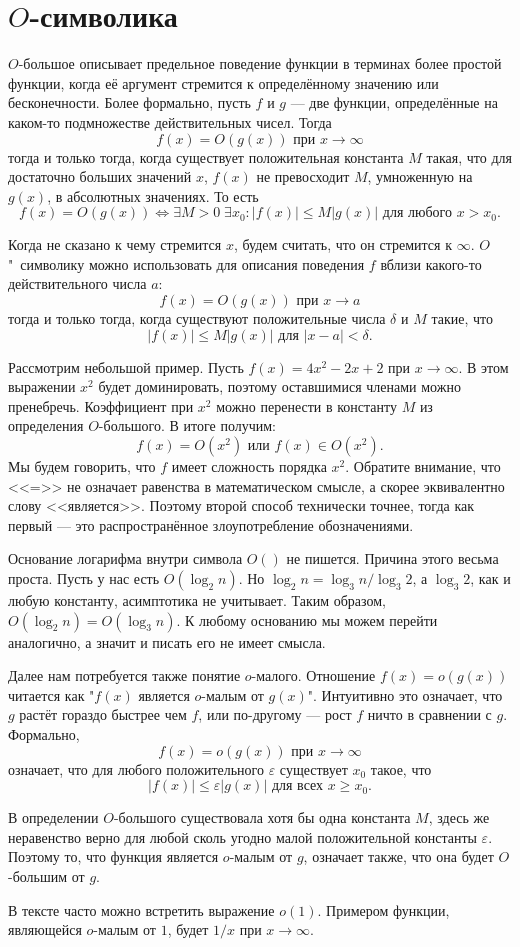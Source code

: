\section{$O$-символика}\label{o_notation}

$O$-большое описывает предельное поведение функции в терминах более простой функции, когда её аргумент стремится к определённому значению или бесконечности. Более формально, пусть $f$ и $g$ --- две функции, определённые на каком-то подмножестве действительных чисел. Тогда
\[
	f(x)=O(g(x)) \mbox{ при } x \rightarrow \infty
\]
тогда и только тогда, когда существует положительная константа $M$ такая, что для достаточно больших значений $x$, $f(x)$ не превосходит $M$, умноженную на $g(x)$, в абсолютных значениях. То есть 
\[
	f(x) = O(g(x)) \iff \exists M > 0 \; \exists x_0: |f(x)| \leq M |g(x)| \mbox{ для любого } x > x_0.
\]

Когда не сказано к чему стремится $x$, будем считать, что он стремится к $\infty$. $O$"~символику можно использовать для описания поведения $f$ вблизи какого-то действительного числа $a$:
\[
	f(x)=O(g(x)) \mbox{ при } x \rightarrow a
\]
тогда и только тогда, когда существуют положительные числа $\delta$ и $M$ такие, что
\[
	|f(x)| \leq M |g(x)| \mbox{ для } |x - a| < \delta.
\]

Рассмотрим небольшой пример. Пусть $f(x) = 4 x^2 - 2 x + 2$ при $x \rightarrow \infty$. В этом выражении $x^2$ будет доминировать, поэтому оставшимися членами можно пренебречь. Коэффициент при $x^2$ можно перенести в константу $M$ из определения $O$-большого. В итоге получим:
\[
	f(x) = O(x^2) \mbox{ или } f(x) \in O(x^2).
\]
Мы будем говорить, что $f$ имеет сложность порядка $x^2$. Обратите внимание, что <<=>> не означает равенства в математическом смысле, а скорее эквивалентно слову <<является>>. Поэтому второй способ технически точнее, тогда как первый --- это распространённое злоупотребление обозначениями.

Основание логарифма внутри символа $O()$ не пишется. Причина этого весьма проста. Пусть у нас есть $O(\log_2 n)$. Но $\log_2 n = \log_3 n / \log_3 2$, а $\log_3 2$, как и любую константу, асимптотика не учитывает. Таким образом, $O(\log_2 n) = O(\log_3 n)$. К любому основанию мы можем перейти аналогично, а значит и писать его не имеет смысла.

Далее нам потребуется также понятие $o$-малого.  \label{little-oh} Отношение $f(x) = o(g(x))$  читается как "$f(x)$ является $o$-малым от $g(x)$". Интуитивно это означает, что $g$ растёт гораздо быстрее чем $f$, или по-другому --- рост $f$ ничто в сравнении с $g$. Формально, 
\[
	f(x) = o(g(x)) \mbox{ при }  x \rightarrow \infty
\] 
означает, что для любого положительного $\varepsilon$ существует $x_0$ такое, что
\[
	|f(x)| \leq \varepsilon |g(x)| \mbox{ для всех } x \geq x_0.
\]

В определении $O$-большого существовала хотя бы одна константа $M$, здесь же неравенство верно для любой сколь угодно малой положительной константы  $\varepsilon$. Поэтому то, что функция является $o$-малым от $g$, означает также, что она будет $O$-большим от $g$. 

В тексте часто можно встретить выражение $o(1)$. Примером функции, являющейся $o$-малым от $1$, будет $1/x$ при $x \rightarrow \infty$.
